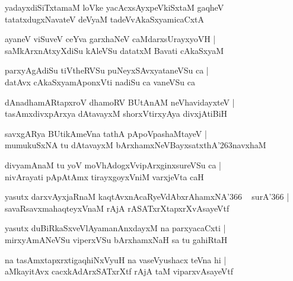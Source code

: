 \documentclass[twoside,12pt,openright]{book}
\def\S{\char'263}
\newcounter{shloka}[chapter]
\begin{document}
\begin{shloka}
yadayxdiSiTxtamaM loVke yacAcxsAyxpeVkiSxtaM gaqheV \\
tatatxdugxNavateV deVyaM tadeVvAkaSxyamicaCxtA
\end{shloka}

\begin{shloka}
ayaneV viSuveV ceYva garxhaNeV caMdarxsUrayxyoVH |\\
saMkArxnAtxyXdiSu kAleVSu datatxM Bavati cAkaSxyaM 
\end{shloka}

\begin{shloka}
parxyAgAdiSu tiVtheRVSu puNeyxSAvxyataneVSu ca |\\
datAvx cAkaSxyamAponxVti nadiSu ca vaneVSu ca 
\end{shloka}

\begin{shloka}
dAnadhamARtapxroV dhamoRV BUtAnAM neVhavidayxteV |\\
tasAmxdivxpArxya dAtavayxM  shorxVtirxyAya divxjAtiBiH 
\end{shloka}

\begin{shloka}
savxgARya BUtikAmeVna tathA pApoVpashaMtayeV |\\
mumukuSxNA tu dAtavayxM bArxhamxNeVBayxsatxthA\S navxhaM 
\end{shloka}

\begin{shloka}
divyamAnaM tu yoV moVhAdogxVvipArxginxsureVSu ca |\\
nivArayati pApAtAmx tirayxgoyxVniM varxjeVta caH 
\end{shloka}

\begin{shloka}
yasutx darxvAyxjaRnaM kaqtAvxnAcaRyeVdAbxrAhamxNA\char'366 ~ surA\char'366 |\\
savaRsavxmahaqteyxVnaM rAjA rASATxrXtapxrXvAsayeVtf 
\end{shloka}

\begin{shloka}
yasutx duBiRkaSxveVlAyamanAnxdayxM na parxyacaCxti |\\
mirxyAmANeVSu viperxVSu bArxhamxNaH sa tu gahiRtaH 
\end{shloka}

\begin{shloka}
na tasAmxtapxrxtigaqhiNxVyuH na vaseVyushacx teVna hi |\\
aMkayitAvx cacxkAdArxSATxrXtf rAjA taM viparxvAsayeVtf 
\end{shloka}
\end{document}

